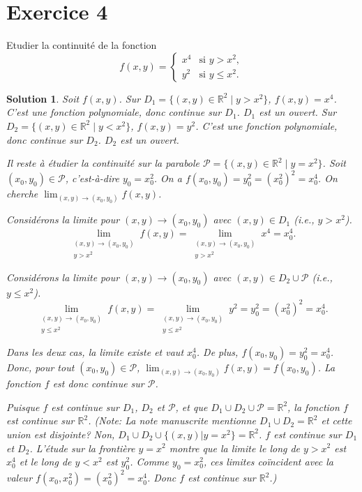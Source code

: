\documentclass{article}
\newtheorem{solution}{Solution}
\begin{document}
\section{Exercice 4}
Etudier la continuité de la fonction
\[ f(x, y) = \begin{cases} x^4 & \text{si } y > x^2, \\ y^2 & \text{si } y \le x^2. \end{cases} \]

\begin{solution}
Soit $f(x,y)$.
Sur $D_1 = \{(x,y) \in \mathbb{R}^2 \mid y > x^2\}$, $f(x,y) = x^4$. C'est une fonction polynomiale, donc continue sur $D_1$. $D_1$ est un ouvert.
Sur $D_2 = \{(x,y) \in \mathbb{R}^2 \mid y < x^2\}$, $f(x,y) = y^2$. C'est une fonction polynomiale, donc continue sur $D_2$. $D_2$ est un ouvert.

Il reste à étudier la continuité sur la parabole $\mathcal{P} = \{(x,y) \in \mathbb{R}^2 \mid y = x^2\}$.
Soit $(x_0, y_0) \in \mathcal{P}$, c'est-à-dire $y_0 = x_0^2$.
On a $f(x_0, y_0) = y_0^2 = (x_0^2)^2 = x_0^4$.
On cherche $\lim_{(x,y) \to (x_0, y_0)} f(x,y)$.

Considérons la limite pour $(x,y) \to (x_0, y_0)$ avec $(x,y) \in D_1$ (i.e., $y > x^2$).
\[ \lim_{\substack{(x,y) \to (x_0, y_0) \\ y > x^2}} f(x,y) = \lim_{\substack{(x,y) \to (x_0, y_0) \\ y > x^2}} x^4 = x_0^4. \]

Considérons la limite pour $(x,y) \to (x_0, y_0)$ avec $(x,y) \in D_2 \cup \mathcal{P}$ (i.e., $y \le x^2$).
\[ \lim_{\substack{(x,y) \to (x_0, y_0) \\ y \le x^2}} f(x,y) = \lim_{\substack{(x,y) \to (x_0, y_0) \\ y \le x^2}} y^2 = y_0^2 = (x_0^2)^2 = x_0^4. \]

Dans les deux cas, la limite existe et vaut $x_0^4$.
De plus, $f(x_0, y_0) = y_0^2 = x_0^4$.
Donc, pour tout $(x_0, y_0) \in \mathcal{P}$, $\lim_{(x,y) \to (x_0, y_0)} f(x,y) = f(x_0, y_0)$.
La fonction $f$ est donc continue sur $\mathcal{P}$.

Puisque $f$ est continue sur $D_1$, $D_2$ et $\mathcal{P}$, et que $D_1 \cup D_2 \cup \mathcal{P} = \mathbb{R}^2$, la fonction $f$ est continue sur $\mathbb{R}^2$.
(Note: La note manuscrite mentionne $D_1 \cup D_2 = \mathbb{R}^2$ et cette union est disjointe? Non, $D_1 \cup D_2 \cup \{(x,y)|y=x^2\} = \mathbb{R}^2$. $f$ est continue sur $D_1$ et $D_2$. L'étude sur la frontière $y=x^2$ montre que la limite le long de $y>x^2$ est $x_0^4$ et le long de $y<x^2$ est $y_0^2$. Comme $y_0=x_0^2$, ces limites coïncident avec la valeur $f(x_0, x_0^2) = (x_0^2)^2=x_0^4$. Donc $f$ est continue sur $\mathbb{R}^2$.)

\end{solution}
\end{document}
